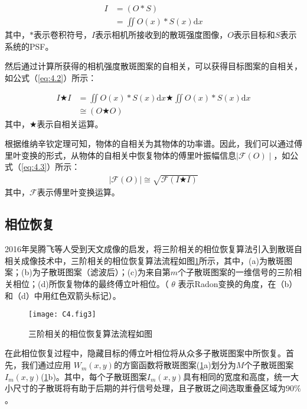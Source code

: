 \begin{equation}
\begin{aligned}
    I &= (O*S)\\
      &= \iint O(x)*S(x) \mathrm{d}{x}
\end{aligned}
\label{eq:4.1}
\end{equation}
其中，$*$表示卷积符号，$I$表示相机所接收到的散斑强度图像，$O$表示目标和$S$表示系统的PSF。

然后通过计算所获得的相机强度散斑图案的自相关，可以获得目标图案的自相关，如公式（\ref{eq:4.2}）所示：

\begin{equation}
\begin{aligned}
    I \bigstar I  &= \iint O(x)*S(x) \mathrm{d}{x} \bigstar \iint O(x)*S(x) \mathrm{d}{x} \\
		              & \cong  (O \bigstar O)
\end{aligned}
\label{eq:4.2}
\end{equation}其中，$\bigstar$表示自相关运算。

根据维纳辛钦定理可知，物体的自相关为其物体的功率谱。因此，我们可以通过傅里叶变换的形式，从物体的自相关中恢复物体的傅里叶振幅信息$\mid \mathcal{F}(O) \mid $，如公式（\ref{eq:4.3}）所示：
\begin{equation}
\begin{aligned}
   \mid \mathcal{F}(O) \mid \cong \sqrt{\mathcal{F}(I \bigstar I)}
\end{aligned}
\label{eq:4.3}
\end{equation}其中，$\mathcal{F}$表示傅里叶变换运算。

\subsection{相位恢复}

2016年吴腾飞等人\cite{wu_single-shot_2016}受到天文成像的启发，将三阶相关的相位恢复算法引入到散斑自相关成像技术中，三阶相关的相位恢复算法流程如图\ref{fig:4.3}所示，其中，(a)为散斑图案；(b)为子散斑图案（滤波后）；(c)为来自第$m$个子散斑图案的一维信号的三阶相关相位；(d)所恢复物体的最终傅立叶相位。（ $\theta$ 表示Radon变换的角度，在（b）和（d）中用红色双箭头标记）。

\begin{figure}[htp]
	\centering
	\texttt{[image: C4.fig3]}
	\caption{三阶相关的相位恢复算法流程如图}
	\label{fig:4.3}
\end{figure}

在此相位恢复过程中，隐藏目标的傅立叶相位将从众多子散斑图案中所恢复。首先，我们通过应用 $W_m(x,y)$的方窗函数将散斑图案(\ref{fig:4.3}a)划分为$M$个子散斑图案$I_m(x,y)$(\ref{fig:4.3}b)。其中，每个子散斑图案$I_m(x,y)$具有相同的宽度和高度，统一大小尺寸的子散斑将有助于后期的并行信号处理，且子散斑之间选取重叠区域为$90\%$。


